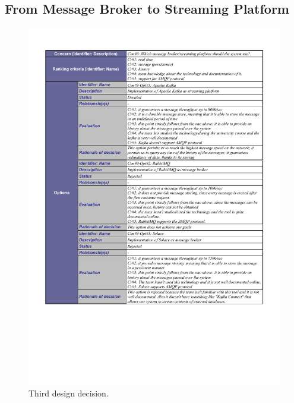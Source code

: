 \subsection{From Message Broker to Streaming Platform}
\label{third_design_decision}

 \begin{figure}[H]
\centering
 \includegraphics[trim=1cm 6.5cm 1cm 1.3cm,clip=true, width=\textwidth]{dd/dd3.pdf}
\caption{Third design decision.}
\end{figure}
